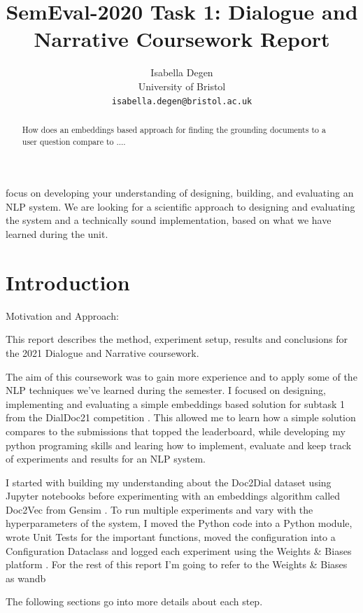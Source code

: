 \documentclass[11pt]{article}
\title{SemEval-2020 Task 1: Dialogue and Narrative Coursework Report}
\author{Isabella Degen \\ University of Bristol \\ {\tt isabella.degen@bristol.ac.uk}}
\date{}
\begin{document}
    \maketitle

    \begin{abstract}
        How does an embeddings based approach for finding the grounding documents to a user question compare to ....

    \end{abstract}

    focus on developing your understanding of designing,  building,  and evaluating an NLP system.
    We are looking for a scientific approach to designing and evaluating the system and a technically sound implementation,
    based on what we have learned during the unit.


    \section{Introduction}\label{sec:introduction}
    Motivation and Approach:

    This report describes the method, experiment setup, results and conclusions for the 2021 Dialogue and Narrative
    coursework.

    The aim of this coursework was to gain more experience and to apply some of the NLP techniques we've learned during
    the semester. I focused on designing, implementing and evaluating a simple embeddings based solution for
    subtask 1 from the DialDoc21
    competition \cite{feng-etal-2020-doc2dial}.
    This allowed me to learn how a simple solution compares to the submissions that topped the leaderboard,
    while developing my python programing skills and
    learing how to implement, evaluate and keep track of experiments and results for an NLP system.

    I started with building my understanding about the Doc2Dial dataset \cite{feng-etal-2020-doc2dial} using Jupyter notebooks
    before experimenting with an embeddings algorithm called Doc2Vec from Gensim \cite{doc2vec}.
    To run multiple experiments and vary with the hyperparameters of the system,
    I moved the Python code into a Python module, wrote Unit Tests for the important functions, moved the configuration
    into a Configuration Dataclass and logged each experiment using
    the Weights \& Biases platform \cite{wandb}. For the rest of this report I'm going to refer to the Weights \& Biases
    as wandb

    The following sections go into more details about each step.
\end{document}
